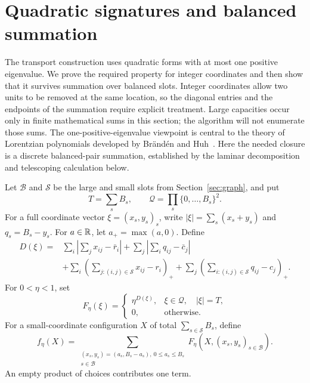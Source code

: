 \section{Quadratic signatures and balanced summation}
\label{sec:signatures}

The transport construction uses quadratic forms with at most one positive
eigenvalue. We prove the required property for integer coordinates and then
show that it survives summation over balanced slots. Integer coordinates
allow two units to be removed at the same location, so the diagonal entries
and the endpoints of the summation require explicit treatment. Large
capacities occur only in finite mathematical sums in this section; the
algorithm will not enumerate those sums.
The one-positive-eigenvalue viewpoint is central to the theory of
Lorentzian polynomials developed by Br\"and\'en and Huh~\cite{BH2020}.
Here the needed closure is a discrete balanced-pair summation, established
by the laminar decomposition and telescoping calculation below.

\begin{definition}\label{def:soft-weight}
Let $\mathcal B$ and $\mathcal S$ be the large and small slots from
Section~\ref{sec:graph}, and put
\[
 T=\sum_s B_s,\qquad
 \mathcal Q=\prod_s\{0,\ldots,B_s\}^2.
\]
For a full coordinate vector $\xi=(x_s,y_s)_s$, write
$|\xi|=\sum_s(x_s+y_s)$ and $q_s=B_s-y_s$.
For $a\in\mathbb{R}$, let $a_+=\max(a,0)$.  Define
\begin{align*}
 D(\xi)={}&\sum_i\left|\sum_jx_{ij}-\bar r_i\right|
       +\sum_j\left|\sum_iq_{ij}-\bar c_j\right|\\
 &+\sum_i\left(\sum_{j:(i,j)\in\mathcal S}x_{ij}-r_i\right)_+
       +\sum_j\left(\sum_{i:(i,j)\in\mathcal S}q_{ij}-c_j\right)_+.
\end{align*}
For $0<\eta<1$, set
\[
 F_\eta(\xi)=
 \begin{cases}
 \eta^{D(\xi)},&\xi\in\mathcal Q,\quad |\xi|=T,\\
 0,&\text{otherwise}.
 \end{cases}
\]
For a small-coordinate configuration $X$ of total $\sum_{s\in\mathcal S}B_s$,
define
\begin{equation}\label{eq:soft-marginal}
 f_\eta(X)=
 \sum_{\substack{(x_s,y_s)=(a_s,B_s-a_s),\ 0\le a_s\le B_s\\
                  s\in\mathcal B}}
 F_\eta(X,(x_s,y_s)_{s\in\mathcal B}).
\end{equation}
An empty product of choices contributes one term.
\end{definition}

